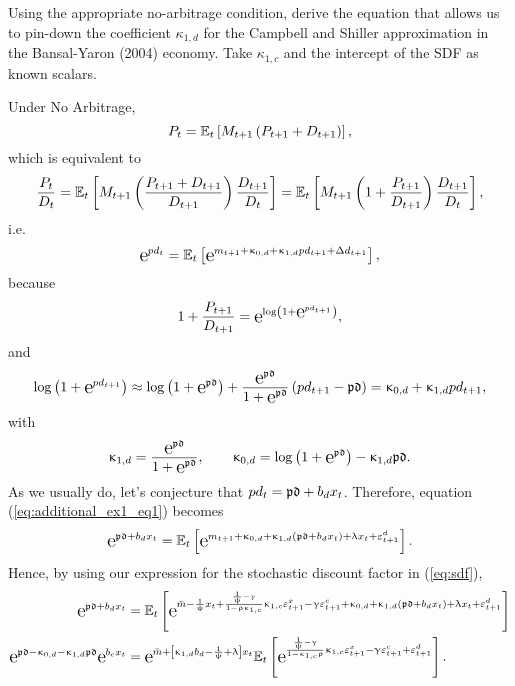 Using the appropriate no-arbitrage condition, derive the equation that allows us to pin-down the coefficient $\kappa_{1,d}$ for the Campbell and Shiller approximation in the Bansal-Yaron (2004) economy. Take $\kappa_{1,c}$ and the intercept of the SDF as known scalars.

\solution  Under No Arbitrage,
\begin{equation}
		P_t = \mathbb{E}_t\left[M_{t+1}\left(P_{t+1}+ D_{t+1}\right)\right],
\end{equation}
which is equivalent to 
\begin{equation}
	\frac{P_t}{D_t} = \mathbb{E}_t\left[M_{t+1}\left(\frac{P_{t+1}+D_{t+1}}{D_{t+1}}\right)\frac{D_{t+1}}{D_t}\right] = \mathbb{E}_t\left[M_{t+1}\left(1 + \frac{P_{t+1}}{D_{t+1}}\right)\frac{D_{t+1}}{D_t}\right],
\end{equation}
i.e.
\begin{equation}\label{eq:additional_ex1_eq1}
	\e{pd_t} = \E_t\left[\e{m_{t+1} + \kappa_{0,d} + \kappa_{1,d} pd_{t+1} + \Delta d_{t+1}}\right],
\end{equation}
because
$$
	1 + \frac{P_{t+1}}{D_{t+1}} = \e{\log\left(1 + \e{pd_{t+1}}\right)},
$$
and
$$
	\log\left(1 + \e{pd_{t+1}}\right) \approx \log\left(1+\e{\pdbar}\right) + \frac{\e{\pdbar}}{1+\e{\pdbar}}\left(pd_{t+1}-\pdbar\right) = \kappa_{0,d} + \kappa_{1,d}pd_{t+1},
$$
with 
\begin{equation}
	\kappa_{1,d} = \frac{\e{\pdbar}}{1+\e{\pdbar}}, \quad\quad \kappa_{0,d} = \log\left(1+\e{\pdbar}\right) - \kappa_{1,d} \pdbar.
\end{equation}
As we usually do, let's conjecture that $pd_{t} = \mathfrak{pd} + b_d x_t$. Therefore, equation (\ref{eq:additional_ex1_eq1}) becomes
$$
	\begin{aligned}
		\e{\pdbar + b_d x_t} = \E_t\left[\e{m_{t+1} + \kappa_{0,d} + \kappa_{1,d}\left(\pdbar + b_d x_t\right) + \lambda x_t + \varepsilon_{t+1}^d}\right].
	\end{aligned}
$$
Hence, by using our expression for the stochastic discount factor in (\ref{eq:sdf}),
\begin{equation}\label{eq:additional_ex1_eq2}
	\begin{aligned}
		\e{\pdbar + b_d x_t} &= \E_t\left[\e{\bar{m} - \frac{1}{\psi}x_t + \frac{\frac{1}{\psi}-\gamma}{1-\rho\kappa_{1,c}}\kappa_{1,c}\varepsilon_{t+1}^x - \gamma\varepsilon_{t+1}^c+ \kappa_{0,d} + \kappa_{1,d}\left(\pdbar + b_d x_t\right) + \lambda x_t + \varepsilon_{t+1}^d}\right] \\
		\e{\pdbar -\kappa_{0,d} - \kappa_{1,d} \pdbar}\e{b_c x_t} &= \e{\bar{m} + \left[\kappa_{1,d}b_d -\frac{1}{\psi}+ \lambda\right] x_t}\E_t\left[\e{\frac{\frac{1}{\psi}-\gamma}{1-\kappa_{1,c}\rho}\kappa_{1,c}\varepsilon_{t+1}^x -\gamma\varepsilon_{t+1}^c + \varepsilon_{t+1}^d} \right].
	\end{aligned}
\end{equation}
